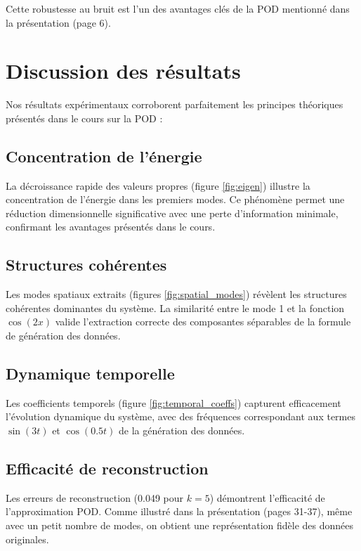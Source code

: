 \documentclass{rapportECL}
\begin{document}
Cette robustesse au bruit est l'un des avantages clés de la POD mentionné dans la présentation (page 6).


\section{Discussion des résultats}

Nos résultats expérimentaux corroborent parfaitement les principes théoriques présentés dans le cours sur la POD :

\subsection{Concentration de l'énergie}
La décroissance rapide des valeurs propres (figure \ref{fig:eigen}) illustre la concentration de l'énergie dans les premiers modes. Ce phénomène permet une réduction dimensionnelle significative avec une perte d'information minimale, confirmant les avantages présentés dans le cours.

\subsection{Structures cohérentes}
Les modes spatiaux extraits (figures \ref{fig:spatial_modes}) révèlent les structures cohérentes dominantes du système. La similarité entre le mode 1 et la fonction \( \cos(2x) \) valide l'extraction correcte des composantes séparables de la formule de génération des données.

\subsection{Dynamique temporelle}
Les coefficients temporels (figure \ref{fig:temporal_coeffs}) capturent efficacement l'évolution dynamique du système, avec des fréquences correspondant aux termes \( \sin(3t) \) et \( \cos(0.5t) \) de la génération des données.

\subsection{Efficacité de reconstruction}
Les erreurs de reconstruction (0.049 pour \( k=5 \)) démontrent l'efficacité de l'approximation POD. Comme illustré dans la présentation (pages 31-37), même avec un petit nombre de modes, on obtient une représentation fidèle des données originales.
\end{document}
